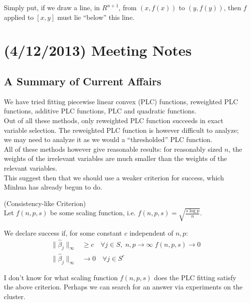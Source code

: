 \documentclass{article}
\begin{document}
Simply put, if we draw a line, in $R^{n+1}$, from $(x, f(x))$ to $(y, f(y))$, then $f$ applied to $[x,y]$ must lie ``below'' this line.\\

\newpage
\section{(4/12/2013) Meeting Notes}

\subsection{A Summary of Current Affairs}

We have tried fitting piecewise linear convex (PLC) functions, reweighted PLC functions, additive PLC functions, PLC and quadratic functions.\\

Out of all these methods, only reweighted PLC function succeeds in exact variable selection. The reweighted PLC function is however difficult to analyze; we may need to analyze it as we would a ``thresholded'' PLC function.\\

All of these methods however give reasonable results: for reasonably sized $n$, the weights of the irrelevant variables are much smaller than the weights of the relevant variables.\\

This suggest then that we should use a weaker criterion for success, which Minhua has already begun to do.

\begin{definition} (Consistency-like Criterion)\\
Let $f(n,p,s)$ be some scaling function, i.e. $f(n,p,s) = \sqrt{\frac{s\log p}{n}}$.

We declare success if, for some constant $c$ independent of $n,p$:
\begin{align*}
\| \hat{\beta}_j \|_\infty &\geq c \quad \forall j \in S, \; n,p \rightarrow \infty \; f(n,p,s) \rightarrow 0 \\
\| \hat{\beta}_j \|_\infty &\rightarrow 0 \quad \forall j \in S^c
\end{align*}
\end{definition}

I don't know for what scaling function $f(n,p,s)$ does the PLC fitting satisfy the above criterion. Perhaps we can search for an answer via experiments on the cluster.\\
\end{document}
